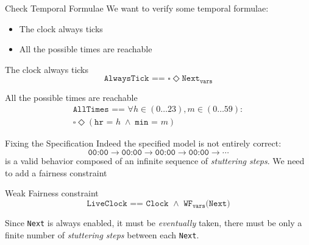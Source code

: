 \begin{frame}{Check Temporal Formulae}
    We want to verify some temporal formulae:
    \begin{itemize}
        \item The clock always ticks
        \item All the possible times are reachable
    \end{itemize}
    \pause
    \begin{block}{The clock always ticks}
        \[
            \texttt{AlwaysTick == } \square \Diamond \texttt{Next}_{\texttt{vars}}
        \]
    \end{block}
    \pause
    \begin{block}{All the possible times are reachable}
        \begin{equation*}
            \begin{gathered}
                \texttt{AllTimes == } \forall h \in (0 \ldots 23), m \in (0 \ldots 59):\\
                \square \Diamond (\texttt{hr = } h\; \land\; \texttt{min = } m)
            \end{gathered}
        \end{equation*}
    \end{block}
    \demo
\end{frame}

\begin{frame}{Fixing the Specification}
    Indeed the specified model is not entirely correct:
    \[
        \texttt{00:00} \rightarrow \texttt{00:00} \rightarrow \texttt{00:00} \rightarrow \texttt{00:00} \rightarrow \cdots
    \]
    is a valid behavior composed of an infinite sequence of \emph{stuttering steps}.
    \pause
    We need to add a fairness constraint
    \begin{block}{Weak Fairness constraint}
        \[
            \texttt{LiveClock == Clock } \land \texttt{ WF}_{\texttt{vars}}\texttt{(Next)}
        \]

        Since \texttt{Next} is always enabled, it must be \emph{eventually} taken, there must be only a finite number of \emph{stuttering steps} between each \texttt{Next}.
    \end{block}
    \demo
\end{frame}
